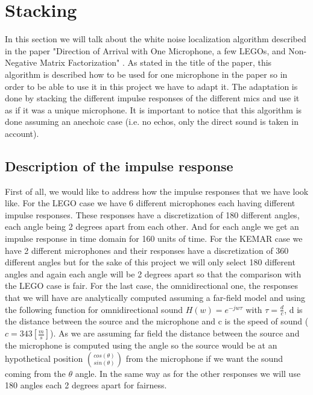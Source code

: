 \section{Stacking}

In this section we will talk about the white noise localization algorithm described in the paper "Direction of Arrival with One Microphone, a few LEGOs, and Non-Negative Matrix Factorization" \cite{dalia}. As stated in the title of the paper, this algorithm is described how to be used for one microphone in the paper so in order to be able to use it in this project we have to adapt it. The adaptation is done by stacking the different impulse responses of the different mics and use it as if it was a unique microphone. It is important to notice that this algorithm is done assuming an anechoic case (i.e. no echos, only the direct sound is taken in account).

\subsection{Description of the impulse response} \label{desc:impulse}

First of all, we would like to address how the impulse responses that we have look like. For the LEGO case we have 6 different microphones each having different impulse responses. These responses have a discretization of 180 different angles, each angle being 2 degrees apart from each other. And for each angle we get an impulse response in time domain for 160 units of time. For the KEMAR case we have 2 different microphones and their responses have a discretization of 360 different angles but for the sake of this project we will only select 180 different angles and again each angle will be 2 degrees apart so that the comparison with the LEGO case is fair. For the last case, the omnidirectional one, the responses that we will have are analytically computed assuming a far-field model and using the following function for omnidirectional sound \begin{math} H(w) = e^{-jw\tau} \end{math} with $\tau = \frac{d}{c}$, d is the distance between the source and the microphone and c is the speed of sound ($c = 343 \left[\frac{m}{s}\right]$). As we are assuming far field the distance between the source and the microphone is computed using the angle so the source would be at an hypothetical position $ \binom{cos(\theta)}{sin(\theta)}$ from the microphone if we want the sound coming from the $\theta$ angle. In the same way as for the other responses we will use 180 angles each 2 degrees apart for fairness.

